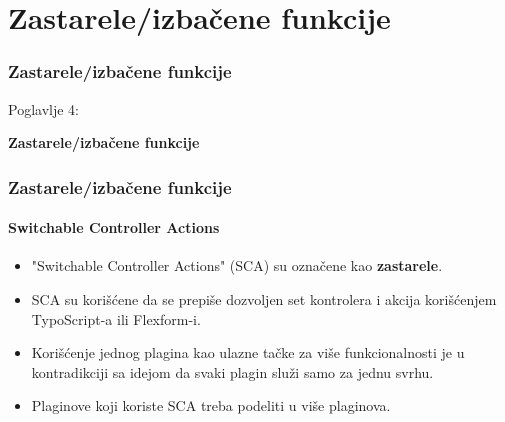 %

\section{Zastarele/izbačene funkcije}
\begin{frame}[fragile]
	\frametitle{Zastarele/izbačene funkcije}

	\begin{center}\huge{Poglavlje 4:}\end{center}
	\begin{center}\huge{\color{typo3darkgrey}\textbf{Zastarele/izbačene funkcije}}\end{center}

\end{frame}


\begin{frame}[fragile]
	\frametitle{Zastarele/izbačene funkcije}
	\framesubtitle{Switchable Controller Actions}

	\begin{itemize}
		\item "Switchable Controller Actions" (SCA) su označene kao \textbf{zastarele}.
		\item SCA su korišćene da se prepiše dozvoljen set kontrolera i akcija korišćenjem TypoScript-a ili Flexform-i.
		\item Korišćenje jednog plagina kao ulazne tačke za više funkcionalnosti je u kontradikciji sa idejom da svaki plagin služi samo za jednu svrhu.
		\item Plaginove koji koriste SCA treba podeliti u više plaginova.
	\end{itemize}

\end{frame}


